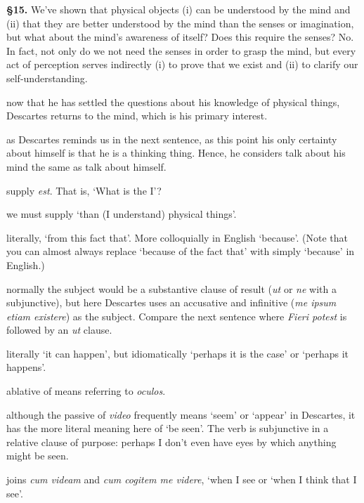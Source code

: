 \prenotes

\textbf{§15.} We've shown that physical objects (i) can be understood by the mind and (ii) that they are better understood by the mind than the senses or imagination, but what about the mind's awareness of itself? Does this require the senses? No. In fact, not only do we not need the senses in order to grasp the mind, but every act of perception serves indirectly (i) to prove that we exist and (ii) to clarify our self-understanding.

 now that he has settled the questions about his knowledge of physical things, Descartes returns to the mind, which is his primary interest.

 as Descartes reminds us in the next sentence, as this point his only certainty about himself is that he is a thinking thing. Hence, he considers talk about his mind the same as talk about himself. 

 supply \textit{est}. That is, `What is the I'?

 we must supply `than (I understand) physical things'.

 literally, `from this fact that'. More colloquially in English `because'. (Note that you can almost always replace `because of the fact that' with simply `because' in English.)

 normally the subject would be a substantive clause of result (\textit{ut} or \textit{ne} with a subjunctive), but here Descartes uses an accusative and infinitive (\textit{me ipsum etiam existere}) as the subject. Compare the next sentence where \textit{Fieri potest} is followed by an \textit{ut} clause.

 literally `it can happen', but idiomatically `perhaps it is the case' or `perhaps it happens'.

 ablative of means referring to \textit{oculos}.

 although the passive of \textit{video} frequently means `seem' or `appear' in Descartes, it has the more literal meaning here of `be seen'. The verb is subjunctive in a relative clause of purpose: perhaps I don't even have eyes by which anything might be seen.

 joins \textit{cum videam} and \textit{cum cogitem me videre}, `when I see or `when I think that I see'.

